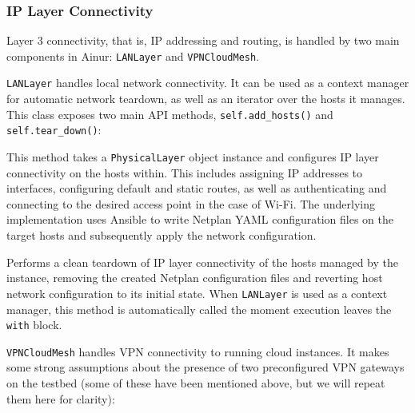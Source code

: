 \subsubsection{\gls{IP} Layer Connectivity}\label{sec:layer3}

Layer 3 connectivity, that is, \gls{IP} addressing and routing, is handled by two main components in Ainur: \texttt{LANLayer} and \texttt{VPNCloudMesh}.

\texttt{LANLayer} handles local network connectivity.
It can be used as a context manager for automatic network teardown, as well as an iterator over the hosts it manages.
This class exposes two main \gls{API} methods, \texttt{self.add_hosts()} and \texttt{self.tear_down()}:
\begin{description}[]
    \item[\texttt{LANLayer.add_hosts(self, layer2)}]
    This method takes a \texttt{PhysicalLayer} object instance and configures \gls{IP} layer connectivity on the hosts within.
    This includes assigning \gls{IP} addresses to interfaces, configuring default and static routes, as well as authenticating and connecting to the desired access point in the case of Wi-Fi.
    The underlying implementation uses Ansible to write Netplan YAML configuration files on the target hosts and subsequently apply the network configuration.

    \item[\texttt{LANLayer.tear_down(self)}]
    Performs a clean teardown of \gls{IP} layer connectivity of the hosts managed by the instance, removing the created Netplan configuration files and reverting host network configuration to its initial state.
    When \texttt{LANLayer} is used as a context manager, this method is automatically called the moment execution leaves the \texttt{with} block.
\end{description}

\texttt{VPNCloudMesh}\label{sec:vpn} handles \gls{VPN} connectivity to running cloud instances.
It makes some strong assumptions about the presence of two preconfigured \gls{VPN} gateways on the testbed (some of these have been mentioned above, but we will repeat them here for clarity):

